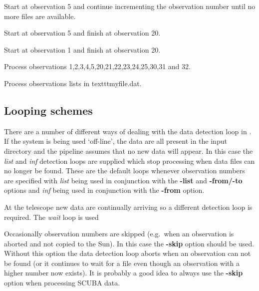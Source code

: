 \documentclass[twoside,11pt,nolof]{starlink}
\providecommand{\oracdr}{\xref{\textsc{orac-dr}}{sun230}{}}
\begin{document}
\begin{terminalv}
\end{terminalv}
Start at observation 5 and continue incrementing the observation number
until no more files are available.
\begin{terminalv}
\end{terminalv}
Start at observation 5 and finish at observation 20.

\begin{terminalv}
\end{terminalv}
Start at observation 1 and finish at observation 20.

\begin{terminalv}
\end{terminalv}
Process observations 1,2,3,4,5,20,21,22,23,24,25,30,31 and 32.

\begin{terminalv}
\end{terminalv}

Process observations lists in texttt{myfile.dat}.

\subsection{Looping schemes}

There are a number of different ways of dealing with the data detection
loop in \oracdr. If the system is being used `off-line', the data are
all present in the input directory and the pipeline assumes that no new
data will appear. In this case the \textit{list} and \textit{inf} detection
loops are supplied which stop processing when data files can no longer
be found. These are the default loops whenever observation
numbers are specified with \textit{list} being used in conjunction with the
\textbf{-list} and \textbf{-from/-to} options and \textit{inf} being
used in conjunction with the \textbf{-from} option.

At the telescope new data are continually arriving so a different detection
loop is required. The \textit{wait} loop is used

Occasionally observation numbers are skipped (e.g.\ when an observation is
aborted and not copied to the Sun). In this case the \textbf{-skip} option
should be used. Without this option the data detection loop aborts when
an observation can not be found (or it continues to wait for a file even
though an observation with a higher number now exists).
It is probably a good idea to always use the \textbf{-skip}
option when processing SCUBA data.
\end{document}
